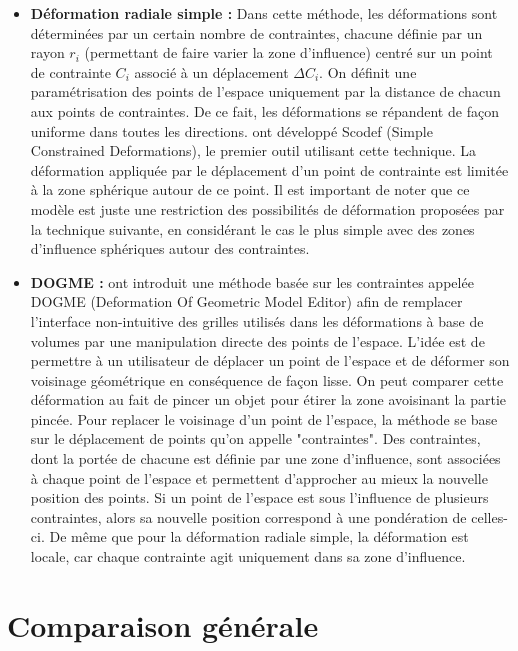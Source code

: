 \begin{itemize}

\item{\textbf{Déformation radiale simple :}} Dans cette méthode, les
déformations sont déterminées par un certain nombre de contraintes,   chacune
définie par un rayon $r_i$ (permettant de faire varier la   zone d'influence)
centré sur un point de contrainte $C_i$ associé à   un déplacement $\Delta C_i$.
On définit une paramétrisation des   points de l'espace uniquement par la
distance de chacun aux points   de contraintes. De ce fait, les déformations se
répandent de façon   uniforme dans toutes les directions. \cite{BR94} ont
développé   Scodef (Simple Constrained Deformations), le premier outil utilisant
cette technique. La déformation appliquée par le déplacement d'un   point de
contrainte est limitée à la zone sphérique autour de ce   point. Il est
important de noter que ce modèle est juste une   restriction des possibilités de
déformation proposées par la   technique suivante, en considérant le cas le plus
simple avec des   zones d'influence sphériques autour des contraintes.

\item{\textbf{DOGME :}} \cite{BB91} ont introduit une méthode basée   sur les
contraintes appelée DOGME (Deformation Of Geometric Model   Editor) afin de
remplacer l'interface non-intuitive des grilles   utilisés dans les déformations
à base de volumes par une   manipulation directe des points de l'espace. L'idée
est de permettre   à un utilisateur de déplacer un point de l'espace et de
déformer son   voisinage géométrique en conséquence de façon lisse. On peut
comparer cette déformation au fait de pincer un objet pour étirer la   zone
avoisinant la partie pincée. Pour replacer le voisinage d'un   point de
l'espace, la méthode se base sur le déplacement de points   qu'on appelle
"contraintes". Des contraintes, dont la portée de   chacune est définie par une
zone d'influence, sont associées à   chaque point de l'espace et permettent
d'approcher au mieux la   nouvelle position des points. Si un point de l'espace
est sous   l'influence de plusieurs contraintes, alors sa nouvelle position
correspond à une pondération de celles-ci. De même que pour la   déformation
radiale simple, la déformation est locale, car chaque   contrainte agit
uniquement dans sa zone d'influence.

\end{itemize}

\newpage

\section{Comparaison générale}

